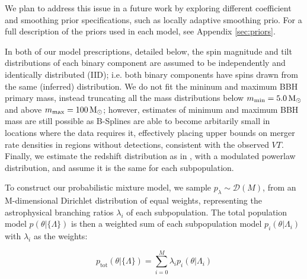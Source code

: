  

We plan to address this issue in a future work by exploring different coefficient and smoothing prior specifications, such as locally adaptive smoothing prio. For a full description of the priors used in each model, see Appendix \ref{sec:priors}.

In both of our model prescriptions, detailed below, the spin magnitude and tilt distributions of each binary component are assumed to be independently and identically distributed (IID); i.e. both binary components have spins drawn from the same (inferred) distribution. We do not fit the mininum and maximum BBH primary mass, instead truncating all the mass distributions below $m_\text{min} = 5.0{\,\rm M}_\odot$ and above $m_\text{max} = 100{\,\rm M}_\odot$; however, estimates of minimum and maximum BBH mass are still possible as B-Splines are able to become arbitarily small in locations where the data requires it, effectively placing upper bounds on merger rate densities in regions without detections, consistent with the observed $VT$. Finally, we estimate the redshift distribution as in \brucepaper, with a modulated powerlaw distribution, and assume it is the same for each subpopulation.

To construct our probabilistic mixture model, we sample $p_{\lambda} \sim \mathcal{D}(M)$, from an M-dimensional Dirichlet distribution of equal weights, representing the astrophysical branching ratios $\lambda_{i}$ of each subpopulation. The total population model $p(\theta | \{\Lambda\})$ is then a weighted sum of each subpopulation model $p_i(\theta|\Lambda_i)$ with $\lambda_i$ as the weights:

\begin{equation} \label{totmixmod}
p_\text{tot}(\theta|\{\Lambda\}) = \sum_{i=0}^{M} \lambda_i p_i(\theta | \Lambda_i)
\end{equation}

